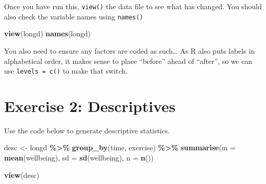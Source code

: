 \documentclass[
]{book}
\newenvironment{Shaded}{\begin{snugshade}}{\end{snugshade}}
\newcommand{\AttributeTok}[1]{\textcolor[rgb]{0.13,0.29,0.53}{#1}}
\newcommand{\FunctionTok}[1]{\textcolor[rgb]{0.13,0.29,0.53}{\textbf{#1}}}
\newcommand{\NormalTok}[1]{#1}
\newcommand{\OtherTok}[1]{\textcolor[rgb]{0.56,0.35,0.01}{#1}}
\newcommand{\SpecialCharTok}[1]{\textcolor[rgb]{0.81,0.36,0.00}{\textbf{#1}}}
\newcommand{\StringTok}[1]{\textcolor[rgb]{0.31,0.60,0.02}{#1}}
\let\oldsection\section
\renewcommand{\section}{\needspace{5\baselineskip}\oldsection}
\begin{document}
Once you have run this, \texttt{view()} the data file to see what has changed. You should also check the variable names using \texttt{names()}

\begin{Shaded}
\begin{Highlighting}[]
\FunctionTok{view}\NormalTok{(longd)}
\FunctionTok{names}\NormalTok{(longd)}
\end{Highlighting}
\end{Shaded}

You also need to ensure any factors are coded as such\ldots{} As R also puts labels in alphabetical order, it makes sense to place ``before'' ahead of ``after'', so we can use \texttt{levels\ =\ c()} to make that switch.

\begin{Shaded}
\end{Shaded}

\section{Exercise 2: Descriptives}\label{exercise-2-descriptives}

Use the code below to generate descriptive statistics.

\begin{Shaded}
\begin{Highlighting}[]
\NormalTok{desc }\OtherTok{\textless{}{-}}\NormalTok{ longd }\SpecialCharTok{\%\textgreater{}\%}
  \FunctionTok{group\_by}\NormalTok{(time, exercise) }\SpecialCharTok{\%\textgreater{}\%}
  \FunctionTok{summarise}\NormalTok{(}\AttributeTok{m =} \FunctionTok{mean}\NormalTok{(wellbeing), }
            \AttributeTok{sd =} \FunctionTok{sd}\NormalTok{(wellbeing), }
            \AttributeTok{n =} \FunctionTok{n}\NormalTok{())}

\FunctionTok{view}\NormalTok{(desc)}
\end{Highlighting}
\end{Shaded}
\end{document}
